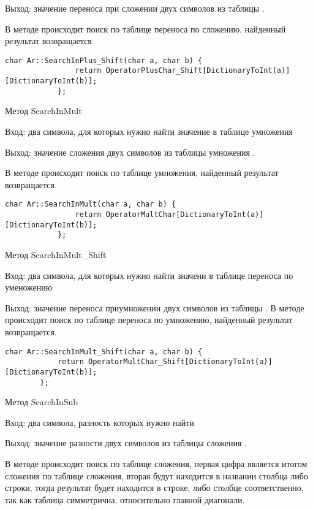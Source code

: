 \documentclass[10pt,a4paper,final]{article} %
\begin{document}
		Выход: значение переноса при сложении двух символов из таблицы .
		
		В методе происходит поиск по таблице переноса по сложению, найденный результат возвращается.
		
		
		\begin{lstlisting}[caption={Метод SearchInPlus\_Shift}]
			char Ar::SearchInPlus_Shift(char a, char b) {
				return OperatorPlusChar_Shift[DictionaryToInt(a)][DictionaryToInt(b)];
			};
		\end{lstlisting}
		
				Метод SearchInMult
		
		Вход: два символа, для которых нужно найти значение в таблице умножения
		
		Выход: значение сложения двух символов из таблицы умножения .
		
		В методе происходит поиск по таблице умножения, найденный результат возвращается.
		
			\begin{lstlisting}[caption={Метод SearchInMult}]
			char Ar::SearchInMult(char a, char b) {	
				return OperatorMultChar[DictionaryToInt(a)][DictionaryToInt(b)];
			};
		\end{lstlisting}
		
				Метод SearchInMult\_Shift
		
		Вход: два символа, для которых нужно найти значени в таблице переноса по уменожению
		
		Выход: значение переноса приумножении двух символов из таблицы .
		В методе происходит поиск по таблице переноса по умножению, найденный результат возвращается.
		
		\begin{lstlisting}[caption={Метод SearchInMult\_Shift}]
		char Ar::SearchInMult_Shift(char a, char b) {	
			return OperatorMultChar_Shift[DictionaryToInt(a)][DictionaryToInt(b)];
		};
	\end{lstlisting}
		
		Метод SearchInSub
		
		Вход: два символа, разность которых нужно найти
		
		Выход: значение разности двух символов из таблицы сложения .
		
		В методе происходит поиск по таблице сложения, первая цифра является итогом сложения по таблице сложения, вторая будут находится в названии столбца либо строки, тогда результат будет находится в строке, либо столбце соответственно, так как таблица симметрична, относительно главной диагонали.
		
\end{document}
